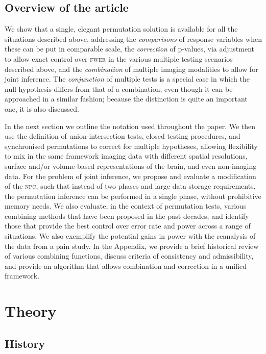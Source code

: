 \subsection{Overview of the article}

We show that a single, elegant permutation solution is available for all the situations described above, addressing the \emph{comparisons} of response variables when these can be put in comparable scale, the \emph{correction} of p-values, via adjustment to allow exact control over \textsc{fwer} in the various multiple testing scenarios described above, and the \emph{combination} of multiple imaging modalities to allow for joint inference. The \emph{conjunction} of multiple tests is a special case in which the null hypothesis differs from that of a combination, even though it can be approached in a similar fashion; because the distinction is quite an important one, it is also discussed.

In the next section we outline the notation used throughout the paper. We then use the definition of union-intersection tests, closed testing procedures, and synchronised permutations to correct for multiple hypotheses, allowing flexibility to mix in the same framework imaging data with different spatial resolutions, surface and/or volume-based representations of the brain, and even non-imaging data. For the problem of joint inference, we propose and evaluate a modification of the \textsc{npc}, such that instead of two phases and large data storage requirements, the permutation inference can be performed in a single phase, without prohibitive memory needs. We also evaluate, in the context of permutation tests, various combining methods that have been proposed in the past decades, and identify those that provide the best control over error rate and power across a range of situations. We also exemplify the potential gains in power with the reanalysis of the data from a pain study. In the Appendix, we provide a brief historical review of various combining functions, discuss criteria of consistency and admissibility, and provide an algorithm that allows combination and correction in a unified framework.

\section{Theory}

\subsection{History}
\label{sec:comb:history}

